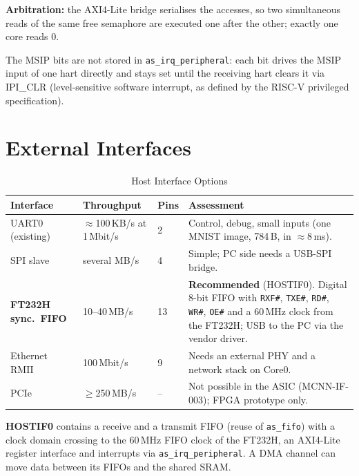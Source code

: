 \textbf{Arbitration:} the AXI4-Lite bridge serialises the accesses, so two
simultaneous reads of the same free semaphore are executed one after the
other; exactly one core reads 0.

The MSIP bits are not stored in \texttt{as\_irq\_peripheral}: each bit
drives the MSIP input of one hart directly and stays set until the
receiving hart clears it via IPI\_CLR (level-sensitive software
interrupt, as defined by the RISC-V privileged specification).

\section{External Interfaces}
\label{sec:mcnnext}

\begin{table}[H]
\caption{Host Interface Options}
\label{tab:mcnnhostif}
\centering
{\footnotesize
\begin{tabularx}{\textwidth}{|l |l |l |X|}
  \hline
  Interface & Throughput & Pins & Assessment \\
  \hline
  \hline
  UART0 (existing) & $\approx$100\,KB/s at 1\,Mbit/s & 2 &
    Control, debug, small inputs (one MNIST image, 784\,B, in $\approx$8\,ms). \\
  \hline
  SPI slave & several MB/s & 4 & Simple; PC side needs a USB-SPI bridge. \\
  \hline
  \textbf{FT232H sync.\ FIFO} & 10--40\,MB/s & 13 &
    \textbf{Recommended} (HOSTIF0). Digital 8-bit FIFO with
    \texttt{RXF\#}, \texttt{TXE\#}, \texttt{RD\#}, \texttt{WR\#}, \texttt{OE\#}
    and a 60\,MHz clock from the FT232H; USB to the PC via the vendor driver. \\
  \hline
  Ethernet RMII & 100\,Mbit/s & 9 & Needs an external PHY and a network stack on Core0. \\
  \hline
  PCIe & $\geq$250\,MB/s & -- & Not possible in the ASIC (MCNN-IF-003); FPGA prototype only. \\
  \hline
\end{tabularx}}
\end{table}

\textbf{HOSTIF0} contains a receive and a transmit FIFO (reuse of
\texttt{as\_fifo}) with a clock domain crossing to the 60\,MHz FIFO clock of
the FT232H, an AXI4-Lite register interface and interrupts via
\texttt{as\_irq\_peripheral}. A DMA channel can move data between its FIFOs
and the shared SRAM.

